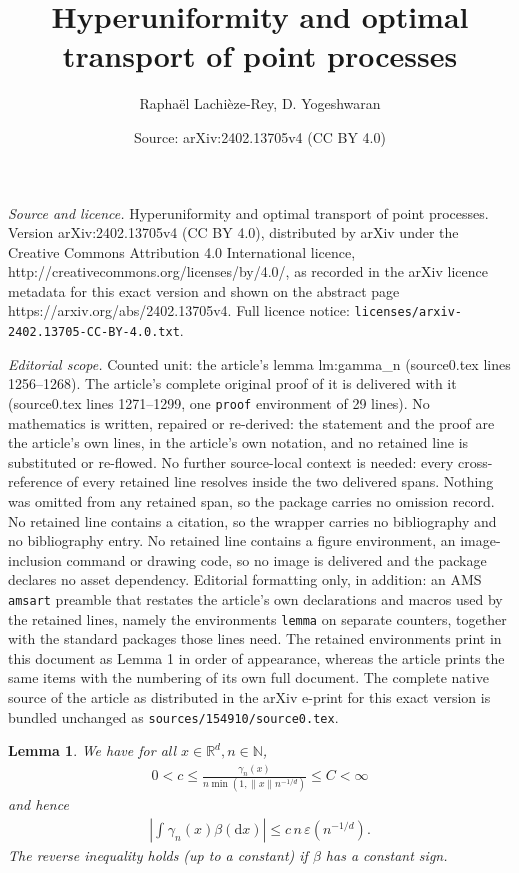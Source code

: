 \documentclass[10pt,a4paper]{amsart}
\title{Hyperuniformity and optimal transport of point processes}
\author{Rapha\"el Lachi\`eze-Rey, D. Yogeshwaran}
\date{Source: arXiv:2402.13705v4 (CC BY 4.0)}
\newtheorem{lemma}{Lemma}
\newcommand{\R}{\mathbb{R}}
\newcommand{\md}{\mathrm{d}}
\begin{document}
\maketitle

\noindent\emph{Source and licence.} Hyperuniformity and optimal transport of point processes. Version arXiv:2402.13705v4 (CC BY 4.0), distributed by arXiv under the Creative Commons Attribution 4.0 International licence, http://creativecommons.org/licenses/by/4.0/, as recorded in the arXiv licence metadata for this exact version and shown on the abstract page https://arxiv.org/abs/2402.13705v4. Full licence notice: \texttt{licenses/arxiv-2402.13705-CC-BY-4.0.txt}.\par\smallskip

\noindent\textit{Editorial scope.} Counted unit: the article's lemma lm:gamma\_n (source0.tex lines 1256--1268). The article's complete original proof of it is delivered with it (source0.tex lines 1271--1299, one \texttt{proof} environment of 29 lines). No mathematics is written, repaired or re-derived: the statement and the proof are the article's own lines, in the article's own notation, and no retained line is substituted or re-flowed.  No further source-local context is needed: every cross-reference of every retained line resolves inside the two delivered spans.  Nothing was omitted from any retained span, so the package carries no omission record.  No retained line contains a citation, so the wrapper carries no bibliography and no bibliography entry.  No retained line contains a figure environment, an image-inclusion command or drawing code, so no image is delivered and the package declares no asset dependency.  Editorial formatting only, in addition: an AMS \texttt{amsart} preamble that restates the article's own declarations and macros used by the retained lines, namely the environments \texttt{lemma} on separate counters, together with the standard packages those lines need.  The retained environments print in this document as Lemma 1 in order of appearance, whereas the article prints the same items with the numbering of its own full document.  The complete native source of the article as distributed in the arXiv e-print for this exact version is bundled unchanged as \texttt{sources/154910/source0.tex}.
\begin{lemma}
\label{lm:gamma_n}
We have for all $x \in \R^d, n \in \mathbb{N}$,
\begin{align}
\label{eq:bd-gamma_n}
0<c\leqslant \frac{ \gamma _{n}(x) }{n\min(1,\|x\|n^{-1/d})}\leqslant C<\infty
\end{align}
and hence
\begin{align*}
 | \int_{}\gamma _{n}(x)\beta (\md x) | \leqslant   c \, n \, \varepsilon (n^{-1/d}).
\end{align*}
The reverse inequality holds (up to a constant) if $ \beta $ has a constant sign.
\end{lemma}
\end{document}
